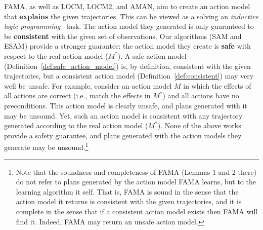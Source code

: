 \documentclass{article}
\newcommand{\realm}{\ensuremath{M^*}\xspace}
\begin{document}
FAMA, as well as LOCM, LOCM2, and AMAN, aim to create an action model that \textbf{explains} the given trajectories. This can be viewed as a solving an \emph{inductive logic programming}~\cite{muggleton1994inductive} task. 
The action model they generated is only guaranteed to be \textbf{consistent} with the given set of observations.
Our algorithms (SAM and ESAM) provide a stronger guarantee: the action model they create is \textbf{safe} with respect to the real action model ($\realm$). 
A safe action model (Definition~\ref{def:safe_action_model}) is, by definition, consistent with the given trajectories, 
but a consistent action model (Definition~\ref{def:consistent}) may very well be unsafe. For example, consider an action model $M$ in which the effects of all actions are correct (i.e., match the effects in $\realm$) and all actions have no preconditions. This action model is clearly unsafe, and plans generated with it may be unsound. Yet, such an action model is consistent with any trajectory generated according to the real action model ($\realm$). 
None of the above works provide a safety guarantee, and plans generated with the action models they generate may be unsound.\footnote{Note that the soundness and completeness of FAMA (Lemmas 1 and 2 there) do not refer to plans generated by the action model FAMA learns, but to the learning algorithm it self. 
That is, FAMA is sound in the sense that the action model it returns is consistent with the given trajectories, and it is complete in the sense that if a consistent action model exists then FAMA will find it. Indeed, FAMA may return an unsafe action model.}
\end{document}
